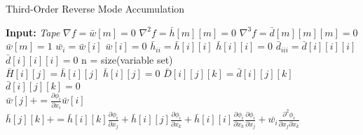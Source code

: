 \documentclass[oneside]{article}
\begin{document}
\clearpage

\begin{algorithm*}[!htb]
  \caption{Third-Order Reverse Mode Accumulation}
  \begin{algorithmic}[1]
\State \textbf{Input:} \textit{Tape}
\State $\nabla f = \bar{w}[m] = 0$
\State $\nabla^2 f =  \bar{h}[m][m] = 0$
\State $\nabla^3 f =  \bar{d}[m][m][m] = 0$ \\

\State $\bar{w}[m] = 1$
\State $\bar{w_i}=\bar{w}[i]$
\State $\bar{w}[i] = 0$
\State $\bar{h}_{ii}=\bar{h}[i][i]$
\State $\bar{h}[i][i] = 0$
\State $\bar{d}_{iii}=\bar{d}[i][i][i]$
\State $\bar{d}[i][i][i] = 0$
\State n = size(variable set) \\
\State $\bar{H}[i][j] = \bar{h}[i][j]$
\State $\bar{h}[i][j] = 0$
\State $\bar{D}[i][j][k] = \bar{d}[i][j][k]$
\State $\bar{d}[i][j][k] = 0$
\EndFor
\EndFor \\
\State $\bar{w}[j] +=  \frac{\partial \phi_i}{\partial x_i}\bar{w}[i]$
\State  $\bar{h}[j][k] += \bar{h}[i][k]  \frac{\partial \phi_i}{\partial x_j} + \bar{h}[i][j]  \frac{\partial \phi_i}{\partial x_k}+\bar{h}[i][i]  \frac{\partial \phi_i}{\partial x_k} \frac{\partial \phi_i}{\partial x_j} + \bar{w_i}\frac{\partial^2 \phi_i}{\partial x_j \partial x_k}$
\State  {}
\end{algorithmic}
\end{algorithm*}
\end{document}
